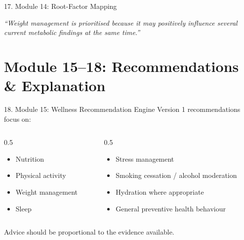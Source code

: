 \documentclass[10pt,aspectratio=169]{beamer}
\begin{document}
\begin{frame}{17. Module 14: Root-Factor Mapping}
\centering
{}
\vfill
\raggedright \footnotesize \textit{``Weight management is prioritised because it may positively influence several current metabolic findings at the same time.''}
\end{frame}

\section{Module 15--18: Recommendations \& Explanation}

\begin{frame}{18. Module 15: Wellness Recommendation Engine}
Version 1 recommendations focus on:
\begin{columns}[T]
\begin{column}{0.5\textwidth}
\begin{itemize}
\item Nutrition
\item Physical activity
\item Weight management
\item Sleep
\end{itemize}
\end{column}
\begin{column}{0.5\textwidth}
\begin{itemize}
\item Stress management
\item Smoking cessation / alcohol moderation
\item Hydration where appropriate
\item General preventive health behaviour
\end{itemize}
\end{column}
\end{columns}
\vfill
Advice should be proportional to the evidence available.
\end{frame}
\end{document}
